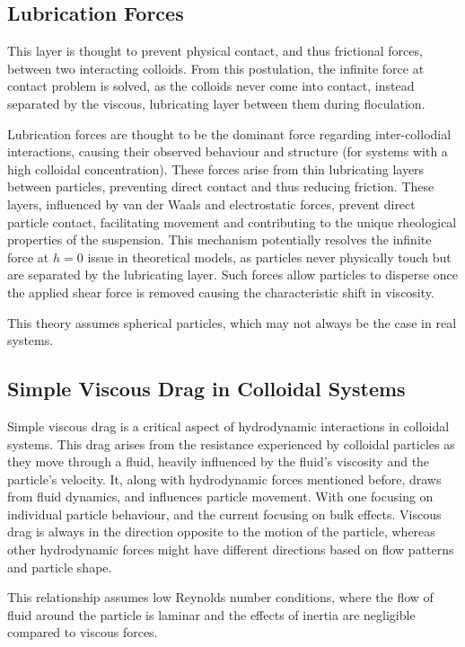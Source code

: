 \subsection{Lubrication Forces}
 This layer is thought to prevent physical contact, and thus frictional forces, between two interacting colloids. From this postulation, the infinite force at contact problem is solved, as the colloids never come into contact, instead separated by the viscous, lubricating layer between them during floculation. 

Lubrication forces are thought to be the dominant force regarding inter-collodial interactions, causing their observed behaviour and structure (for systems with a high colloidal concentration). These forces arise from thin lubricating layers between particles, preventing direct contact and thus reducing friction. These layers, influenced by van der Waals and electrostatic forces, prevent direct particle contact, facilitating movement and contributing to the unique rheological properties of the suspension. This mechanism potentially resolves the infinite force at $h = 0$ issue in theoretical models, as particles never physically touch but are separated by the lubricating layer. Such forces allow particles to disperse once the applied shear force is removed causing the characteristic shift in viscosity. \cite{israelachvili2011intermolecular}

This theory assumes spherical particles, which may not always be the case in real systems.

\subsection{Simple Viscous Drag in Colloidal Systems}

Simple viscous drag is a critical aspect of hydrodynamic interactions in colloidal systems. This drag arises from the resistance experienced by colloidal particles as they move through a fluid, heavily influenced by the fluid's viscosity and the particle's velocity. It, along with hydrodynamic forces mentioned before, draws from fluid dynamics, and influences particle movement. With one focusing on individual particle behaviour, and the current focusing on bulk effects. Viscous drag is always in the direction opposite to the motion of the particle, whereas other hydrodynamic forces might have different directions based on flow patterns and particle shape.

This relationship assumes low Reynolds number conditions, where the flow of fluid around the particle is laminar and the effects of inertia are negligible compared to viscous forces.

